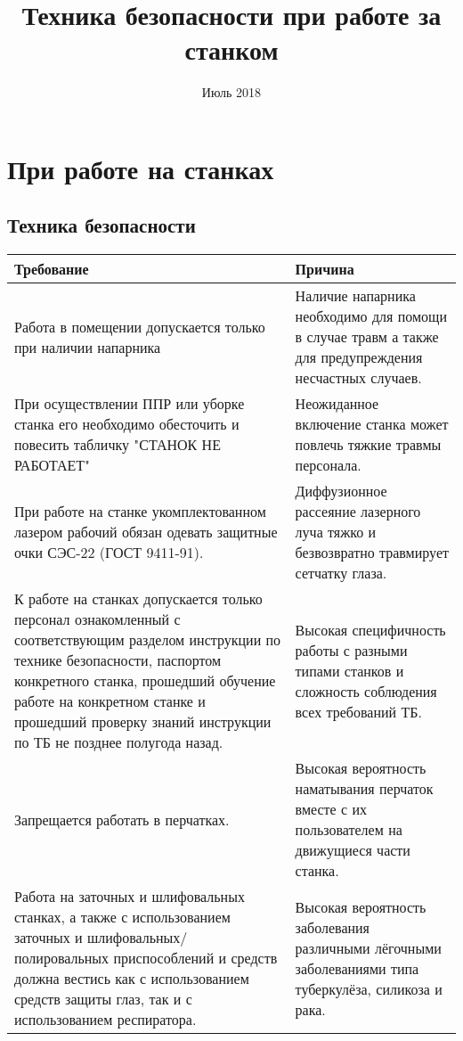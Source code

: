 \documentclass[a4paper,
	twoside,
	russian]{article}
\begin{document}
\title{Техника безопасности при работе за станком}
\date{Июль 2018}
\maketitle

\newpage
\tableofcontents

\clearpage
\section{При работе на станках}


\subsection{Техника безопасности}
\begin{tabulary}{\linewidth}{LL}
\textbf{Требование} & \textbf{Причина} \\
\hline
Работа в помещении допускается только при наличии напарника
&
Наличие напарника необходимо для помощи в случае травм а также для
предупреждения несчастных случаев.
\\ \hline
При осуществлении ППР или уборке станка его необходимо обесточить и
повесить табличку "СТАНОК НЕ РАБОТАЕТ"
&
Неожиданное включение станка может повлечь тяжкие травмы персонала.
\\ \hline
При работе на станке укомплектованном лазером рабочий обязан одевать
защитные очки СЭС-22 (ГОСТ 9411-91).
&
Диффузионное рассеяние лазерного луча тяжко и безвозвратно травмирует
сетчатку глаза.
\\ \hline
К работе на станках допускается только персонал ознакомленный с
соответствующим разделом инструкции по технике безопасности, паспортом
конкретного станка, прошедший обучение работе на конкретном станке и
прошедший проверку знаний инструкции по ТБ не позднее полугода назад.
&
Высокая специфичность работы с разными типами станков и сложность
соблюдения всех требований ТБ.
\\ \hline
Запрещается работать в перчатках.
&
Высокая вероятность наматывания перчаток вместе с их пользователем на
движущиеся части станка.
\\ \hline
Работа на заточных и шлифовальных станках, а также с использованием
заточных и шлифовальных/полировальных приспособлений и средств
должна вестись как с использованием средств защиты глаз, так и с
использованием респиратора.
&
Высокая вероятность заболевания различными лёгочными заболеваниями
типа туберкулёза, силикоза и рака.
\\ \hline

\end{tabulary}
\end{document}
